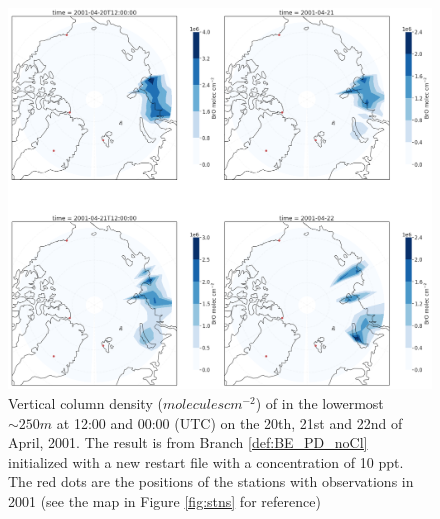 \begin{figure}[h]
    \centering
    \includegraphics[width=\linewidth]{Chapter6_Results/images/polarBro_newRestart.png}
    \caption{Vertical column density ($molecules cm^{-2}$) of  in the lowermost $\sim 250 m$ at 12:00 and 00:00 (UTC) on the 20th, 21st and 22nd of April, 2001. The result is from Branch \ref{def:BE_PD_noCl} initialized with a new restart file with a  concentration of 10 ppt. The red dots are the positions of the stations with observations in 2001 (see the map in Figure \ref{fig:stns} for reference)}
    \label{fig:polarBro_newRestart}
\end{figure}